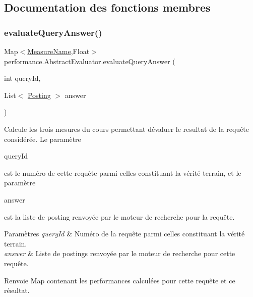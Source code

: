 \subsection{Documentation des fonctions membres}
\mbox{\label{classperformance_1_1AbstractEvaluator_a7f6fd1bcf738d91e0a1e5fc0f24d84f2}} 
\subsubsection{\texorpdfstring{evaluate\+Query\+Answer()}{evaluateQueryAnswer()}}
{\footnotesize\ttfamily Map$<$\hyperlink{enumperformance_1_1AbstractEvaluator_1_1MeasureName}{Measure\+Name},Float$>$ performance.\+Abstract\+Evaluator.\+evaluate\+Query\+Answer (\begin{DoxyParamCaption}\item[{int}]{query\+Id,  }\item[{List$<$ \hyperlink{classindexation_1_1content_1_1Posting}{Posting} $>$}]{answer }\end{DoxyParamCaption})\hspace{0.3cm}{\ttfamily [protected]}}

Calcule les trois mesures du cours permettant d\textquotesingle{}évaluer le resultat de la requête considérée. Le paramètre
\begin{DoxyCode}
queryId 
\end{DoxyCode}
 est le numéro de cette requête parmi celles constituant la vérité terrain, et le paramètre
\begin{DoxyCode}
answer 
\end{DoxyCode}
 est la liste de posting renvoyée par le moteur de recherche pour la requête.


\begin{DoxyParams}{Paramètres}
{\em query\+Id} & Numéro de la requête parmi celles constituant la vérité terrain. \\
\hline
{\em answer} & Liste de postings renvoyée par le moteur de recherche pour cette requête. \\
\hline
\end{DoxyParams}
\begin{DoxyReturn}{Renvoie}
Map contenant les performances calculées pour cette requête et ce résultat. 
\end{DoxyReturn}
\mbox{\label{classperformance_1_1AbstractEvaluator_a289fd837249498b0d1016777189c98cc}} 
